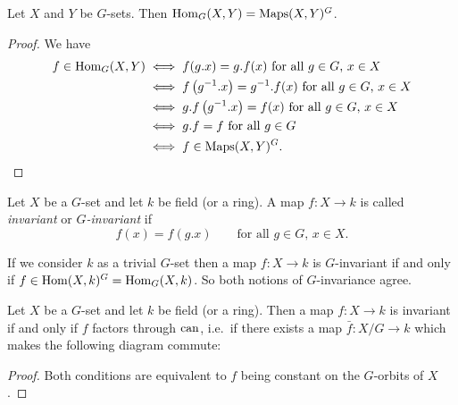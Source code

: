 \begin{lem}
  Let $X$ and $Y$ be $G$-sets.
  Then $\operatorname{Hom}_G(X,Y) = \operatorname{Maps}(X,Y)^G$.
\end{lem}
\begin{proof}
  We have
  \begin{align*}
          f \in \operatorname{Hom}_G(X,Y)
    &\iff \text{$f(g.x) = g.f(x)$ for all $g \in G$, $x \in X$} \\
    &\iff \text{$f\left( g^{-1}.x \right) = g^{-1}.f(x)$ for all $g \in G$, $x \in X $} \\
    &\iff \text{$g.f\left( g^{-1}.x \right) = f(x)$ for all $g \in G$, $x \in X$} \\
    &\iff \text{$g.f = f$ for all $g \in G$}  \\
    &\iff f \in \operatorname{Maps}(X,Y)^G.
    \qedhere
  \end{align*}
\end{proof}


\begin{defi}
  Let $X$ be a $G$-set and let $k$ be field \textup(or a ring\textup).
  A map $f \colon X \to k$ is called \emph{invariant} or \emph{$G$-invariant} if
  \[
      f(x)
    = f\left( g.x \right)
    \qquad
    \text{for all $g \in G$, $x \in X$}.
  \]
\end{defi}


\begin{note}
  If we consider $k$ as a trivial $G$-set then a map $f \colon X \to k$ is $G$-invariant if and only if $f \in \operatorname{Hom}(X,k)^G = \operatorname{Hom}_G(X,k)$.
  So both notions of $G$-invariance agree.
\end{note}


\begin{lem}
  Let $X$ be a $G$-set and let $k$ be field \textup(or a ring\textup).
  Then a map $f \colon X \to k$ is invariant if and only if $f$ factors through $\operatorname{can}$, i.e.\ if there exists a map $\bar{f} \colon X/G \to k$ which makes the following diagram commute:
  \begin{center}
  \end{center}
\end{lem}
\begin{proof}
  Both conditions are equivalent to $f$ being constant on the $G$-orbits of $X$.
\end{proof}


